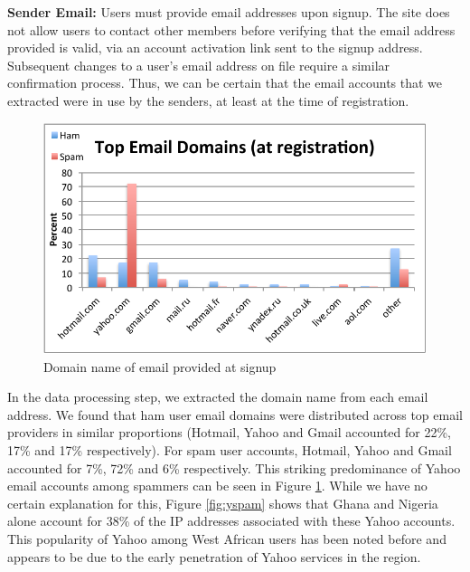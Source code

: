 \documentclass[preprint]{acm_proc_article-sp}
\begin{document}
\textbf{Sender Email:} Users must provide email addresses upon signup. The site does not allow users to contact other 
members before verifying that the email address provided is valid, via an account activation link sent to the signup 
address. Subsequent changes to a user's email address on file require a similar confirmation process. Thus, we can be certain 
that the email accounts that we extracted were in use by the senders, at least at the time of registration. 

\begin{figure}[h]
    \centering
    \includegraphics[width=\linewidth]{figures/email.pdf}
    \caption{Domain name of email provided at signup}
    \label{fig:email}
\end{figure}

In the data processing step, we extracted the domain name from each email address. We found that ham user email domains 
were distributed across top email providers in similar proportions (Hotmail, Yahoo and Gmail accounted for 22\%, 17\% and 17\% 
respectively). For spam user accounts, Hotmail, Yahoo and Gmail accounted for 7\%, 72\% and 6\% respectively. This striking 
predominance of Yahoo email accounts among spammers can be seen in Figure \ref{fig:email}. While we have no certain 
explanation for this, Figure \ref{fig:yspam} shows that Ghana and Nigeria alone account for 38\% of the IP 
addresses associated with these Yahoo accounts. This popularity of Yahoo among West African users has 
been noted before\cite{burrell} and appears to be due to the early penetration of Yahoo services in the region.
\end{document}
